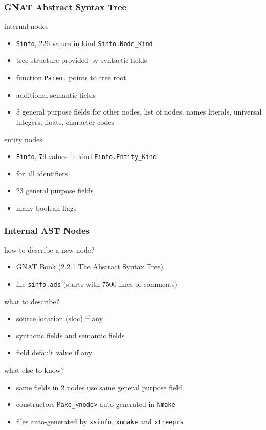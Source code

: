 \documentclass{beamer}
\newcommand{\vs}{\vspace{0.5cm}}
\newenvironment{specialframe}{%
  \begin{frame}[fragile,environment=specialframe]}{\end{frame}}
\begin{document}
\begin{specialframe}
  \frametitle{GNAT Abstract Syntax Tree}

\begin{block}{internal nodes}
  \begin{itemize}
  \item \verb|Sinfo|, 226 values in kind \verb|Sinfo.Node_Kind|
  \item tree structure provided by syntactic fields
  \item function \verb|Parent| points to tree root
  \item additional semantic fields
  \item 5 general purpose fields for other nodes, list of nodes, names
    literals, universal integers, floats, character codes
  \end{itemize}
\end{block}

\begin{block}{entity nodes}
  \begin{itemize}
  \item \verb|Einfo|, 79 values in kind \verb|Einfo.Entity_Kind|
  \item for all identifiers
  \item 23 general purpose fields
  \item many boolean flags
  \end{itemize}
\end{block}

\end{specialframe}

\begin{specialframe}
  \frametitle{Internal AST Nodes}

how to describe a new node?
\begin{itemize}
\item GNAT Book (2.2.1 The Abstract Syntax Tree)
\item file \verb|sinfo.ads| (starts with 7500 lines of comments)
\end{itemize}

\vs

what to describe?
\begin{itemize}
\item source location (sloc) if any
\item syntactic fields and semantic fields
\item field default value if any
\end{itemize}

\vs

what else to know?
\begin{itemize}
\item same fields in 2 nodes use same general purpose field
\item constructors \verb|Make_<node>| auto-generated in \verb|Nmake|
\item files auto-generated by \verb|xsinfo|, \verb|xnmake| and \verb|xtreeprs|
\end{itemize}

\end{specialframe}
\end{document}
